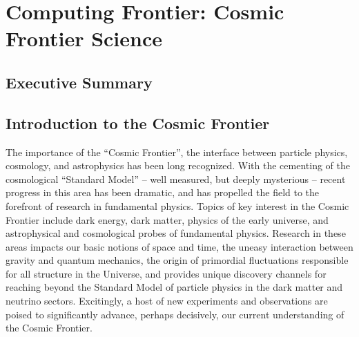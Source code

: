  
\chapter{Computing Frontier: Cosmic Frontier Science}
\label{chap:mag}


\begin{center}\begin{boldmath}

%

\end{boldmath}\end{center}


\section{Executive Summary}
\label{sec:comp-exec}

\section{Introduction to the Cosmic Frontier}

The importance of the “Cosmic Frontier”, the interface between
particle physics, cosmology, and astrophysics has been long
recognized. With the cementing of the cosmological “Standard Model” --
well measured, but deeply mysterious -- recent progress in this area
has been dramatic, and has propelled the field to the forefront of
research in fundamental physics. Topics of key interest in the Cosmic
Frontier include dark energy, dark matter, physics of the early
universe, and astrophysical and cosmological probes of fundamental
physics. Research in these areas impacts our basic notions of space
and time, the uneasy interaction between gravity and quantum
mechanics, the origin of primordial fluctuations responsible for all
structure in the Universe, and provides unique discovery channels for
reaching beyond the Standard Model of particle physics in the dark
matter and neutrino sectors. Excitingly, a host of new experiments and
observations are poised to significantly advance, perhaps decisively,
our current understanding of the Cosmic Frontier.

